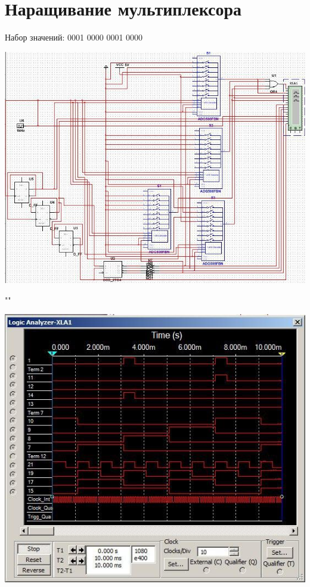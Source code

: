 \documentclass[a4paper,12pt]{article}
\begin{document}
\section{Наращивание мультиплексора}
Набор значений: 0001 0000 0001 0000
\begin{center}
	\includegraphics[scale=0.7]{../screens/7.jpg}
	
	""
	
	\includegraphics[scale=0.73]{../screens/8.jpg}
	
\end{center}
\end{document}
